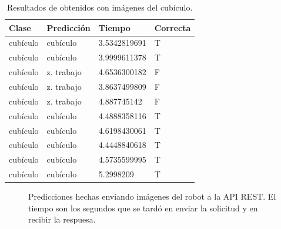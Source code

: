 \begin{table}[!h]
\centering
\begin{tabular}{|l|l|l|l|}
\hline
Clase   & Predicción & Tiempo        & Correcta \\ \hline
cubículo & cubículo    & 3.5342819691 & T        \\ \hline
cubículo & cubículo    & 3.9999611378 & T        \\ \hline
cubículo & z. trabajo & 4.6536300182 & F        \\ \hline
cubículo & z. trabajo & 3.8637499809 & F        \\ \hline
cubículo & z. trabajo & 4.887745142  & F        \\ \hline
cubículo & cubículo    & 4.4888358116 & T        \\ \hline
cubículo & cubículo    & 4.6198430061 & T        \\ \hline
cubículo & cubículo    & 4.4448840618 & T        \\ \hline
cubículo & cubículo    & 4.5735599995 & T        \\ \hline
cubículo & cubículo    & 5.2998209    & T        \\ \hline
\end{tabular}
\caption{Resultados de obtenidos con imágenes del cubículo.}
\label{table:office}
\end{table}

\begin{figure}[!ht] 
  \centering
{}
\qquad
{}
\qquad
{}
\qquad
{}
\caption{Predicciones hechas enviando imágenes del robot a la API REST. El tiempo son los
segundos que se tardó en enviar la solicitud y en recibir la respuesa. \label{nao_api_images}}
\end{figure}
